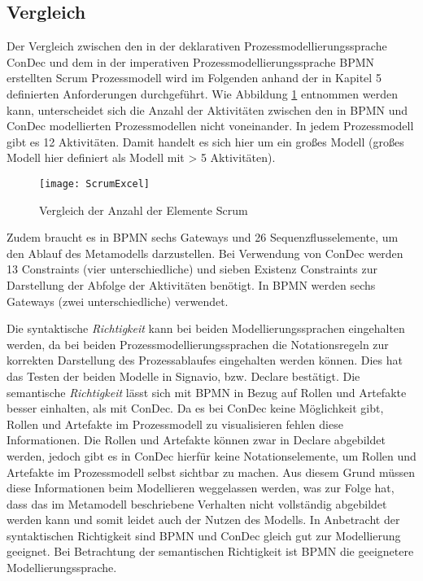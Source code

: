 \subsection{Vergleich}

Der Vergleich zwischen den in der deklarativen Prozessmodellierungssprache ConDec und dem in der imperativen Prozessmodellierungssprache BPMN erstellten Scrum Prozessmodell wird im Folgenden anhand der in Kapitel 5 definierten Anforderungen durchgeführt. \newline
Wie Abbildung \ref{fig:ScrumExcel} entnommen werden kann, unterscheidet sich die Anzahl der Aktivitäten zwischen den in BPMN und ConDec modellierten Prozessmodellen nicht voneinander. In jedem Prozessmodell gibt es 12 Aktivitäten. Damit handelt es sich hier um ein großes Modell (großes Modell hier definiert als Modell mit > 5 Aktivitäten).\newline

\begin{figure}[htp]
\begin{center}
  \texttt{[image: ScrumExcel]} %
  \caption{Vergleich der Anzahl der Elemente Scrum}
  \label{fig:ScrumExcel}
\end{center}
\end{figure}


Zudem braucht es in BPMN sechs Gateways und 26 Sequenzflusselemente, um den Ablauf des Metamodells darzustellen. Bei Verwendung von ConDec werden 13 Constraints (vier unterschiedliche) und sieben Existenz Constraints zur Darstellung der Abfolge der Aktivitäten benötigt. In BPMN werden sechs Gateways (zwei unterschiedliche) verwendet.\newline


Die syntaktische \textit{Richtigkeit} kann bei beiden Modellierungssprachen eingehalten werden, da bei beiden Prozessmodellierungssprachen die Notationsregeln zur korrekten Darstellung des Prozessablaufes eingehalten werden können. Dies hat das Testen der beiden Modelle in Signavio, bzw. Declare bestätigt.\newline
Die semantische \textit{Richtigkeit} lässt sich mit BPMN in Bezug auf Rollen und Artefakte besser einhalten, als mit ConDec. Da es bei ConDec keine Möglichkeit gibt, Rollen und Artefakte im Prozessmodell zu visualisieren fehlen diese Informationen. Die Rollen und Artefakte können zwar in Declare abgebildet werden, jedoch gibt es in ConDec hierfür keine Notationselemente, um Rollen und Artefakte im Prozessmodell selbst sichtbar zu machen. Aus diesem Grund müssen diese Informationen beim Modellieren weggelassen werden, was zur Folge hat, dass das im Metamodell beschriebene Verhalten nicht vollständig abgebildet werden kann und somit leidet auch der Nutzen des Modells.\newline
In Anbetracht der syntaktischen Richtigkeit sind BPMN und ConDec gleich gut zur Modellierung geeignet. Bei Betrachtung der semantischen Richtigkeit ist BPMN die geeignetere Modellierungssprache.


